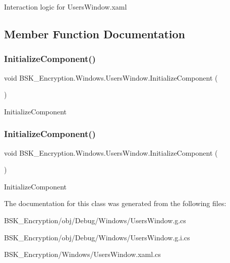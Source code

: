 Interaction logic for Users\+Window.\+xaml 

\subsection{Member Function Documentation}
\mbox{\label{class_b_s_k___encryption_1_1_windows_1_1_users_window_a2c471ea1e3ac60997266866d55f7b202}} 
\subsubsection{\texorpdfstring{Initialize\+Component()}{InitializeComponent()}\hspace{0.1cm}{\footnotesize\ttfamily [1/2]}}
{\footnotesize\ttfamily void B\+S\+K\+\_\+\+Encryption.\+Windows.\+Users\+Window.\+Initialize\+Component (\begin{DoxyParamCaption}{ }\end{DoxyParamCaption})}



Initialize\+Component 

\mbox{\label{class_b_s_k___encryption_1_1_windows_1_1_users_window_a2c471ea1e3ac60997266866d55f7b202}} 
\subsubsection{\texorpdfstring{Initialize\+Component()}{InitializeComponent()}\hspace{0.1cm}{\footnotesize\ttfamily [2/2]}}
{\footnotesize\ttfamily void B\+S\+K\+\_\+\+Encryption.\+Windows.\+Users\+Window.\+Initialize\+Component (\begin{DoxyParamCaption}{ }\end{DoxyParamCaption})}



Initialize\+Component 



The documentation for this class was generated from the following files\+:\begin{DoxyCompactItemize}
\item 
B\+S\+K\+\_\+\+Encryption/obj/\+Debug/\+Windows/Users\+Window.\+g.\+cs\item 
B\+S\+K\+\_\+\+Encryption/obj/\+Debug/\+Windows/Users\+Window.\+g.\+i.\+cs\item 
B\+S\+K\+\_\+\+Encryption/\+Windows/Users\+Window.\+xaml.\+cs\end{DoxyCompactItemize}
